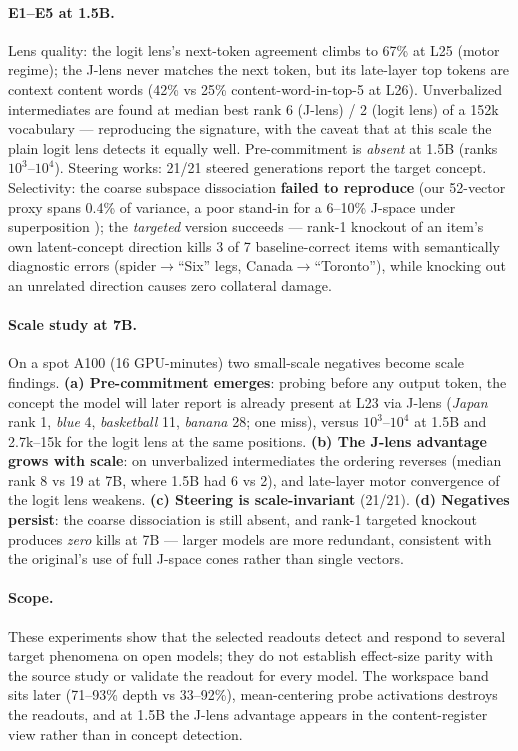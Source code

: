 \documentclass{article}
\newcommand{\jlens}{J\mbox{-}lens}
\begin{document}
\paragraph{E1--E5 at 1.5B.} Lens quality: the logit lens's next-token agreement climbs to 67\% at L25 (motor regime); the \jlens{} never matches the next token, but its late-layer top tokens are context content words (42\% vs 25\% content-word-in-top-5 at L26). Unverbalized intermediates are found at median best rank 6 (\jlens{}) / 2 (logit lens) of a 152k vocabulary --- reproducing the signature, with the caveat that at this scale the plain logit lens detects it equally well. Pre-commitment is \emph{absent} at 1.5B (ranks $10^3$--$10^4$). Steering works: 21/21 steered generations report the target concept. Selectivity: the coarse subspace dissociation \textbf{failed to reproduce} (our 52-vector proxy spans 0.4\% of variance, a poor stand-in for a 6--10\% J-space under superposition \citep{elhage2022}); the \emph{targeted} version succeeds --- rank-1 knockout of an item's own latent-concept direction kills 3 of 7 baseline-correct items with semantically diagnostic errors (spider$\to$``Six'' legs, Canada$\to$``Toronto''), while knocking out an unrelated direction causes zero collateral damage.

\paragraph{Scale study at 7B.} On a spot A100 (16 GPU-minutes) two small-scale negatives become scale findings. \textbf{(a) Pre-commitment emerges}: probing before any output token, the concept the model will later report is already present at L23 via \jlens{} (\emph{Japan} rank 1, \emph{blue} 4, \emph{basketball} 11, \emph{banana} 28; one miss), versus $10^3$--$10^4$ at 1.5B and 2.7k--15k for the logit lens at the same positions. \textbf{(b) The \jlens{} advantage grows with scale}: on unverbalized intermediates the ordering reverses (median rank 8 vs 19 at 7B, where 1.5B had 6 vs 2), and late-layer motor convergence of the logit lens weakens. \textbf{(c) Steering is scale-invariant} (21/21). \textbf{(d) Negatives persist}: the coarse dissociation is still absent, and rank-1 targeted knockout produces \emph{zero} kills at 7B --- larger models are more redundant, consistent with the original's use of full J-space cones rather than single vectors.

\paragraph{Scope.} These experiments show that the selected readouts detect and respond to several target phenomena on open models; they do not establish effect-size parity with the source study or validate the readout for every model. The workspace band sits later (71--93\% depth vs 33--92\%), mean-centering probe activations destroys the readouts, and at 1.5B the \jlens{} advantage appears in the content-register view rather than in concept detection.
\end{document}
